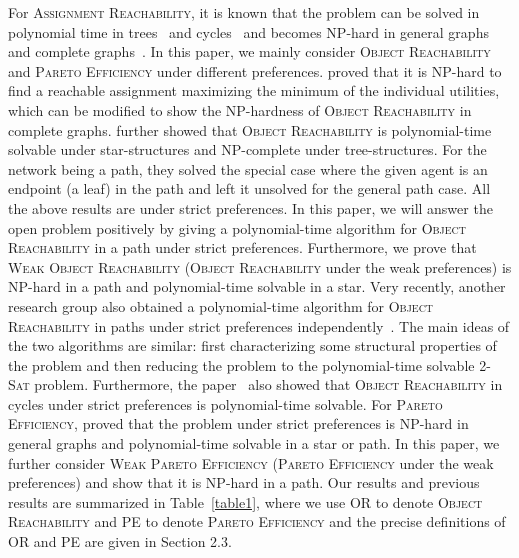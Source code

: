 For \textsc{Assignment Reachability}, it is known that the problem can be solved in polynomial time in trees~\citep{DBLP:conf/ijcai/GourvesLW17} and cycles~\citep{DBLP:journals/corr/abs-2005-02218} and becomes NP-hard in general graphs~\citep{DBLP:conf/ijcai/GourvesLW17} and complete graphs~\citep{DBLP:journals/corr/abs-2005-02218}.
 In this paper, we mainly consider \textsc{Object Reachability} and \textsc{Pareto Efficiency} under different preferences.
\citet{DBLP:conf/atal/DamammeBCM15} proved that it is NP-hard to find a reachable assignment maximizing  the
minimum of the individual utilities, which can be modified to show the NP-hardness of \textsc{Object Reachability} in complete graphs.
\citet{DBLP:conf/ijcai/GourvesLW17} further showed that \textsc{Object Reachability}
is polynomial-time solvable under star-structures and NP-complete under tree-structures.
For the network being a path, they solved the special case where the given agent is an endpoint (a leaf) in the path and left it unsolved for the general path case. All the above results are under strict preferences.
In this paper, we will answer the open problem positively by giving a polynomial-time algorithm for \textsc{Object Reachability}
in a path under strict preferences.
Furthermore, we prove that \textsc{Weak Object Reachability} (\textsc{Object Reachability} under the weak preferences)
is NP-hard in a path and polynomial-time solvable in a star.
Very recently, another research group also obtained a polynomial-time algorithm for \textsc{Object Reachability}
in paths under strict preferences independently~\cite{DBLP:journals/corr/abs-1905-04219}. The main ideas of the two algorithms are similar: first characterizing some structural properties of the problem and then reducing the problem to the polynomial-time solvable \textsc{2-Sat} problem. Furthermore, the paper~\cite{DBLP:journals/corr/abs-1905-04219} also showed that  \textsc{Object Reachability}
in cycles under strict preferences is polynomial-time solvable.
For \textsc{Pareto Efficiency},
\citet{DBLP:conf/ijcai/GourvesLW17} proved that the problem under strict preferences is NP-hard in general graphs and polynomial-time solvable in a star or path.
 In this paper, we further consider \textsc{Weak Pareto Efficiency} (\textsc{Pareto Efficiency} under the weak preferences) and show that it is NP-hard in a path.
Our results and previous results are summarized in Table~\ref{table1}, where we use OR to denote \textsc{Object Reachability} and PE to denote \textsc{Pareto Efficiency} and the precise definitions of OR and PE are given in Section 2.3.

